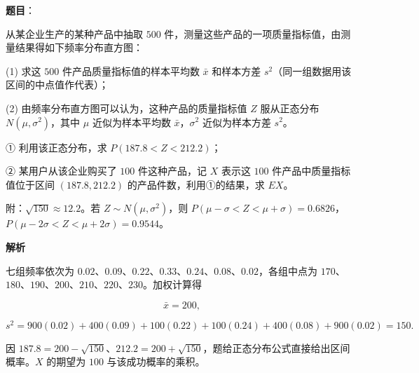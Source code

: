 \begin{answer}

\textbf{题目}：

从某企业生产的某种产品中抽取 $500$ 件，测量这些产品的一项质量指标值，由测量结果得如下频率分布直方图：
\nopagebreak[4]
\begin{center}\end{center}
\nopagebreak[4]
(1) 求这 $500$ 件产品质量指标值的样本平均数 $\bar x$ 和样本方差 $s^2$（同一组数据用该区间的中点值作代表）；

(2) 由频率分布直方图可以认为，这种产品的质量指标值 $Z$ 服从正态分布 $N(\mu,\sigma^2)$，其中 $\mu$ 近似为样本平均数 $\bar x$，$\sigma^2$ 近似为样本方差 $s^2$。

① 利用该正态分布，求 $P(187.8<Z<212.2)$；

② 某用户从该企业购买了 $100$ 件这种产品，记 $X$ 表示这 $100$ 件产品中质量指标值位于区间 $(187.8,212.2)$ 的产品件数，利用①的结果，求 $EX$。

附：$\sqrt{150}\approx12.2$。若 $Z\sim N(\mu,\sigma^2)$，则 $P(\mu-\sigma<Z<\mu+\sigma)=0.6826$，$P(\mu-2\sigma<Z<\mu+2\sigma)=0.9544$。

\textbf{解析}


七组频率依次为 $0.02$、$0.09$、$0.22$、$0.33$、$0.24$、$0.08$、$0.02$，各组中点为 $170$、$180$、$190$、$200$、$210$、$220$、$230$。加权计算得

\nopagebreak[4]
\[
\bar x=200,
\]

\nopagebreak[4]
\[
s^2=900(0.02)+400(0.09)+100(0.22)+100(0.24)+400(0.08)+900(0.02)=150.
\]


因 $187.8=200-\sqrt{150}$、$212.2=200+\sqrt{150}$，题给正态分布公式直接给出区间概率。$X$ 的期望为 $100$ 与该成功概率的乘积。



\end{answer}
